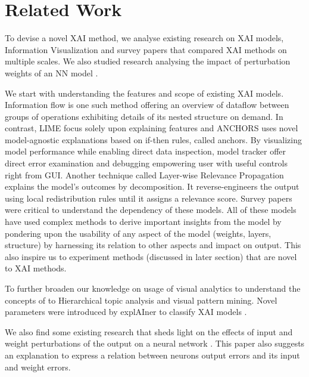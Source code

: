 \documentclass[journal]{vgtc}                %
\begin{document}
\section{Related Work}
To devise a novel XAI method, we analyse existing research
on XAI models, Information Visualization and
survey papers that compared XAI methods on multiple scales.
We also studied research analysing the impact of perturbation weights of an NN model \cite{microsoft2015modeltracker}.

We start with understanding the features and scope of existing XAI models\cite{mein}. 
Information flow \cite{infomationflow} is one such method offering an overview of dataflow between groups of operations exhibiting
details of its nested structure on demand. 
In contrast, LIME \cite{lime}  focus solely upon explaining features
and ANCHORS \cite{anchors}  uses novel  model-agnostic 
explanations based on if-then rules, 
called anchors.
 By visualizing model  performance while  enabling  direct  data  inspection, model tracker \cite{microsoft2015modeltracker} offer direct
error examination and debugging empowering user with useful controls right from GUI.
Another technique called Layer-wise Relevance Propagation  \cite{LRP} explains the model’s outcomes by decomposition. 
It reverse-engineers the output using local redistribution rules until it assigns a relevance score.
Survey papers  \cite{xai,2019survey} were critical to understand the dependency of these models.
All of these models have used complex methods to derive
important insights from the model by pondering upon the usability of any aspect of the model (weights, layers, structure) by harnessing its relation to other aspects and impact on output. This also inspire us to experiment methods (discussed in later section) that are novel to XAI methods.

To further broaden our knowledge on usage of visual analytics to understand the concepts of \cite{IMLViz} to Hierarchical topic analysis and visual pattern mining. Novel parameters were introduced by explAIner \cite{xai} to classify XAI models \cite{xai3}. 

We also find some existing research that sheds light on the effects of input and weight perturbations of the output on a neural network \cite{sensitivity}. This paper also suggests an explanation to express a relation between neurons output errors and its input and weight errors.
\end{document}

